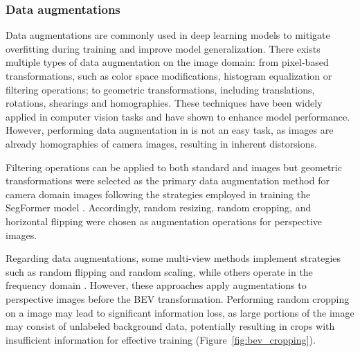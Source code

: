 \subsubsection{Data augmentations}
\label{sec:data_augmentations}
Data augmentations are commonly used in deep learning models to mitigate overfitting during training and improve model generalization. There exists multiple types of data augmentation on the image domain: from pixel-based transformations, such as color space modifications, histogram equalization or filtering operations; to geometric transformations, including translations, rotations, shearings and homographies. These techniques have been widely applied in computer vision tasks and have shown to enhance model performance. However, performing data augmentation in  is not an easy task, as  images are already homographies of camera images, resulting in inherent distorsions.

Filtering operations can be applied to both standard and  images but geometric transformations were selected as the primary data augmentation method for camera domain images following the strategies employed in training the SegFormer model \cite{segformer}. Accordingly, random resizing, random cropping, and horizontal flipping were chosen as augmentation operations for perspective images.

Regarding  data augmentations, some multi-view methods implement strategies such as random flipping and random scaling, while others operate in the frequency domain \cite{HSDA}. However, these approaches apply augmentations to perspective images before the BEV transformation. Performing random cropping on a  image may lead to significant information loss, as large portions of the image may consist of unlabeled background data, potentially resulting in crops with insufficient information for effective training (Figure~\ref{fig:bev_cropping}). 

